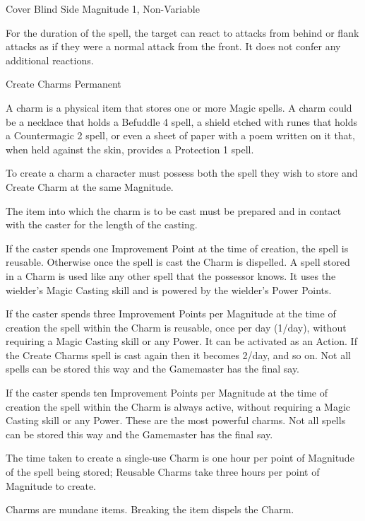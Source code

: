 \begin{rpg-spell}
{Cover Blind Side}
{Magnitude 1, Non-Variable}

For the duration of the spell, the target can react to attacks from behind or flank attacks as if they were a normal attack from the front. It does not confer any additional reactions.
\end{rpg-spell}


\begin{rpg-spell}
{Create Charms}
{Permanent}

A charm is a physical item that stores one or more Magic spells. A charm could be a necklace that holds a Befuddle 4 spell, a shield etched with runes that holds a Countermagic 2 spell, or even a sheet of paper with a poem written on it that, when held against the skin, provides a Protection 1 spell.

\begin{rpg-list}
\item To create a charm a character must possess both the spell they wish to store and Create Charm at the same Magnitude.
\item The item into which the charm is to be cast must be prepared and in contact with the caster for the length of the casting.
\item If the caster spends one Improvement Point at the time of creation, the spell is reusable. Otherwise once the spell is cast the Charm is dispelled. A spell stored in a Charm is used like any other spell that the possessor knows. It uses the wielder’s Magic Casting skill and is powered by the wielder’s Power Points.
\item If the caster spends three Improvement Points per Magnitude at the time of creation the spell within the Charm is reusable, once per day (1/day), without requiring a Magic Casting skill or any Power. It can be activated as an Action. If the Create Charms spell is cast again then it becomes 2/day, and so on. Not all spells can be stored this way and the Gamemaster has the final say.
\item If the caster spends ten Improvement Points per Magnitude at the time of creation the spell within the Charm is always active, without requiring a Magic Casting skill or any Power. These are the most powerful charms. Not all spells can be stored this way and the Gamemaster has the final say.
\item The time taken to create a single-use Charm is one hour per point of Magnitude of the spell being stored; Reusable Charms take three hours per point of Magnitude to create.
\item Charms are mundane items. Breaking the item dispels the Charm.
\end{rpg-list}
\end{rpg-spell}


